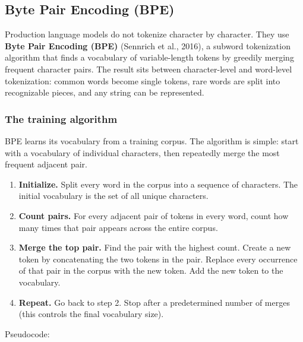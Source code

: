 \subsection{Byte Pair Encoding (BPE)}

Production language models do not tokenize character by character. They use \textbf{Byte Pair Encoding (BPE)} (Sennrich et al., 2016), a subword tokenization algorithm that finds a vocabulary of variable-length tokens by greedily merging frequent character pairs. The result sits between character-level and word-level tokenization: common words become single tokens, rare words are split into recognizable pieces, and any string can be represented.

\subsubsection{The training algorithm}

BPE learns its vocabulary from a training corpus. The algorithm is simple: start with a vocabulary of individual characters, then repeatedly merge the most frequent adjacent pair.

\begin{enumerate}
  \item \textbf{Initialize.} Split every word in the corpus into a sequence of characters. The initial vocabulary is the set of all unique characters.
  \item \textbf{Count pairs.} For every adjacent pair of tokens in every word, count how many times that pair appears across the entire corpus.
  \item \textbf{Merge the top pair.} Find the pair with the highest count. Create a new token by concatenating the two tokens in the pair. Replace every occurrence of that pair in the corpus with the new token. Add the new token to the vocabulary.
  \item \textbf{Repeat.} Go back to step 2. Stop after a predetermined number of merges (this controls the final vocabulary size).
\end{enumerate}

Pseudocode:

